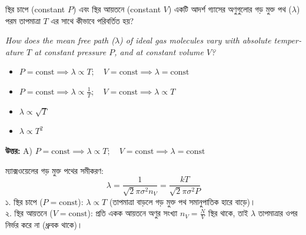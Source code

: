 \documentclass[12pt, a4paper]{article}
\begin{document}
\vspace{2em}

\begin{tcolorbox}[questionbox={প্রশ্ন (Question) 19}]
    \noindent
    স্থির চাপে (constant $P$) এবং স্থির আয়তনে (constant $V$) একটি আদর্শ গ্যাসের অণুগুলোর গড় মুক্ত পথ ($\lambda$) পরম তাপমাত্রা $T$ এর সাথে কীভাবে পরিবর্তিত হয়?
    
    \vspace{0.8em}
    \begin{english}
    \noindent\textit{\color{darkgray}
    How does the mean free path ($\lambda$) of ideal gas molecules vary with absolute temperature $T$ at constant pressure $P$, and at constant volume $V$?
    }
    \end{english}
\end{tcolorbox}

\begin{itemize}[label={}, leftmargin=1cm, itemsep=0.5em]
    \item[\textbf{A)}] $P = \text{const} \implies \lambda \propto T; \quad V = \text{const} \implies \lambda = \text{const}$
    \item[\textbf{B)}] $P = \text{const} \implies \lambda \propto \frac{1}{T}; \quad V = \text{const} \implies \lambda \propto T$
    \item[\textbf{C)}] $\lambda \propto \sqrt{T}$
    \item[\textbf{D)}] $\lambda \propto T^2$
\end{itemize}

\vspace{0.5em}
\begin{tcolorbox}[answerbox]
    \textbf{\color{success} উত্তর:} A) $P = \text{const} \implies \lambda \propto T; \quad V = \text{const} \implies \lambda = \text{const}$
\end{tcolorbox}
\vspace{1em}

\begin{tcolorbox}[solutionbox={সমাধান (Solution)}]
    \noindent
    ম্যাক্সওয়েলের গড় মুক্ত পথের সমীকরণ:
    \[ \lambda = \frac{1}{\sqrt{2} \pi \sigma^2 n_V} = \frac{k T}{\sqrt{2} \pi \sigma^2 P} \]
    ১. স্থির চাপে ($P = \text{const}$): $\lambda \propto T$ (তাপমাত্রা বাড়লে গড় মুক্ত পথ সমানুপাতিক হারে বাড়ে)। \\
    ২. স্থির আয়তনে ($V = \text{const}$): প্রতি একক আয়তনে অণুর সংখ্যা $n_V = \frac{N}{V}$ স্থির থাকে, তাই $\lambda$ তাপমাত্রার ওপর নির্ভর করে না (ধ্রুবক থাকে)।
\end{tcolorbox}
\end{document}
